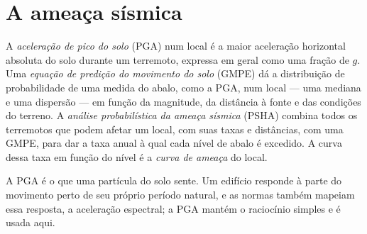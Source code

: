 \section{A ameaça sísmica}\label{sec:b2:geological-hazards:seismic}

\begin{definition}\label{def:b2:geological-hazards:psha}
A \emph{aceleração de pico do solo} (PGA) num local é a maior
aceleração horizontal absoluta do solo durante um terremoto, expressa em geral como uma
fração de $g$. Uma \emph{equação de predição do movimento do solo}
(GMPE) dá a distribuição de probabilidade de uma medida do abalo, como a PGA, num
local --- uma mediana e uma dispersão --- em função da magnitude, da distância à fonte
e das condições do terreno. A \emph{análise probabilística da ameaça sísmica}
(PSHA) combina todos os terremotos que podem afetar um local, com suas
taxas e distâncias, com uma GMPE, para dar a taxa anual à qual cada nível de abalo é
excedido. A curva dessa taxa em função do nível é a \emph{curva de
ameaça} do local.
\end{definition}

A PGA é o que uma partícula do solo sente. Um edifício responde à parte do
movimento perto de seu próprio período natural, e as normas também mapeiam essa resposta, a aceleração espectral;
a PGA mantém o raciocínio simples e é usada aqui.

